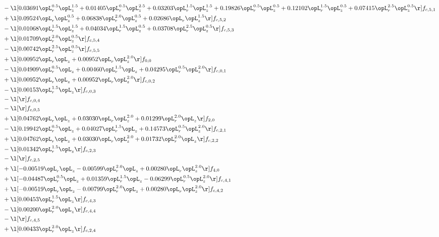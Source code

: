 \begin{alignat}{2}
& - \l[  0.03691 \opL_r^{0.5} \opL_z^{1.5} +  0.01405 \opL_r^{0.5} \opL_z^{2.5} +  0.03203 \opL_r^{1.5} \opL_z^{1.5} +  0.19826 \opL_r^{0.5} \opL_z^{0.5} +  0.12102 \opL_r^{1.5} \opL_z^{0.5} +  0.07415 \opL_r^{2.5} \opL_z^{0.5}  \r] f_{c,5,1} \nonumber \\ 
& + \l[  0.09524 \opL_r \opL_z^{0.5} +  0.06838 \opL_r^{2.0} \opL_z^{0.5} +  0.02686 \opL_r \opL_z^{1.5}  \r] f_{c,5,2} \nonumber \\ 
& - \l[  0.01068 \opL_r^{1.5} \opL_z^{1.5} +  0.04034 \opL_r^{1.5} \opL_z^{0.5} +  0.03708 \opL_r^{2.5} \opL_z^{0.5}  \r] f_{c,5,3} \nonumber \\ 
& + \l[  0.01709 \opL_r^{2.0} \opL_z^{0.5}  \r] f_{c,5,4} \nonumber \\ 
& - \l[  0.00742 \opL_r^{2.5} \opL_z^{0.5}  \r] f_{c,5,5} \nonumber \\ 
& + \l[  0.00952 \opL_r \opL_z +  0.00952 \opL_r \opL_z^{2.0}  \r] f_{0,0} \nonumber \\ 
& - \l[  0.04909 \opL_r^{0.5} \opL_z +  0.00460 \opL_r^{1.5} \opL_z +  0.04295 \opL_r^{0.5} \opL_z^{2.0}  \r] f_{c,0,1} \nonumber \\ 
& + \l[  0.00952 \opL_r \opL_z +  0.00952 \opL_r \opL_z^{2.0}  \r] f_{c,0,2} \nonumber \\ 
& - \l[  0.00153 \opL_r^{1.5} \opL_z  \r] f_{c,0,3} \nonumber \\ 
& - \l[  \r] f_{c,0,4} \nonumber \\ 
& - \l[  \r] f_{c,0,5} \nonumber \\ 
& + \l[  0.04762 \opL_r \opL_z +  0.03030 \opL_r \opL_z^{2.0} +  0.01299 \opL_r^{2.0} \opL_z  \r] f_{2,0} \nonumber \\ 
& - \l[  0.19942 \opL_r^{0.5} \opL_z +  0.04027 \opL_r^{1.5} \opL_z +  0.14573 \opL_r^{0.5} \opL_z^{2.0}  \r] f_{c,2,1} \nonumber \\ 
& + \l[  0.04762 \opL_r \opL_z +  0.03030 \opL_r \opL_z^{2.0} +  0.01732 \opL_r^{2.0} \opL_z  \r] f_{c,2,2} \nonumber \\ 
& - \l[  0.01342 \opL_r^{1.5} \opL_z  \r] f_{c,2,3} \nonumber \\ 
& - \l[  \r] f_{c,2,5} \nonumber \\ 
& + \l[  -0.00519 \opL_r \opL_z   -0.00599 \opL_r^{2.0} \opL_z +  0.00280 \opL_r \opL_z^{2.0}  \r] f_{4,0} \nonumber \\ 
& + \l[  -0.04487 \opL_r^{0.5} \opL_z +  0.01359 \opL_r^{1.5} \opL_z   -0.06299 \opL_r^{0.5} \opL_z^{2.0}  \r] f_{c,4,1} \nonumber \\ 
& + \l[  -0.00519 \opL_r \opL_z   -0.00799 \opL_r^{2.0} \opL_z +  0.00280 \opL_r \opL_z^{2.0}  \r] f_{c,4,2} \nonumber \\ 
& + \l[  0.00453 \opL_r^{1.5} \opL_z  \r] f_{c,4,3} \nonumber \\ 
& - \l[  0.00200 \opL_r^{2.0} \opL_z  \r] f_{c,4,4} \nonumber \\ 
& - \l[  \r] f_{c,4,5} \nonumber \\ 
& + \l[  0.00433 \opL_r^{2.0} \opL_z  \r] f_{c,2,4} \nonumber \\ 
\end{alignat} 


